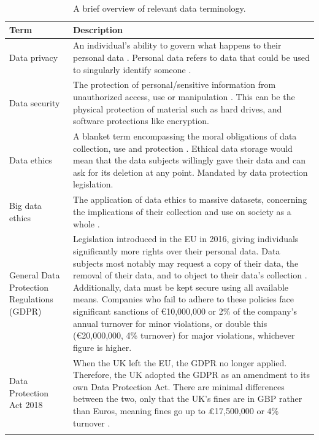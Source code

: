 \documentclass[12pt]{report}
\begin{document}
\begin{longtable}{ | p{} | p{} |}
    \hline
    \cellcolor{blue!25}Term & \cellcolor{blue!25}Description\\
    \hline
    Data privacy & An individual's ability to govern what happens to their personal data \autocite{cloudflare_what_nodate}. Personal data 
    refers to data that could be used to singularly identify someone \autocite{yang_big_2021}.\\
    \hline
    Data security & The protection of personal/sensitive information from unauthorized access, use or manipulation \autocite{ibm_security_2021}.
    This can be the physical protection of material such as hard drives, and software protections like encryption. \\
    \hline
    Data ethics & A blanket term encompassing the moral obligations of data collection, use and protection \autocite{harvard_business_school_5_2021}.
    Ethical data storage would mean that the data subjects willingly gave their data and can ask for its deletion at any point. 
    Mandated by data protection legislation. \\
    \hline 
    Big data ethics & The application of data ethics to massive datasets, concerning the implications of their collection and use on society as a whole
    \autocite{richards_big_2014}. \\ %
    \hline 
    General Data \newline Protection \newline Regulations (GDPR) & Legislation introduced in the EU in 2016, giving individuals significantly more 
    rights over their personal data. Data subjects most notably may request a copy of their data, the removal of their data, and to object to their data's 
    collection \autocite{ico_guide_2024}. Additionally, data must be kept secure using all available means. Companies who fail to adhere to these policies
    face significant sanctions of \euro10,000,000 or 2\% of the company's annual turnover for minor violations, or double this (\euro20,000,000, 4\% turnover)
    for major violations, whichever figure is higher. \\
    \hline
    Data Protection Act 2018 & When the UK left the EU, the GDPR no longer applied. Therefore, the UK adopted the GDPR as an amendment to its own
    Data Protection Act. There are minimal differences between the two, only that the UK's fines are in GBP rather than Euros, meaning fines go up 
    to \pounds17,500,000 or 4\% turnover \autocite{ico_enforcement_2024}. \\
    \hline
\caption{A brief overview of relevant data terminology.}\label{tab:dataTerms}
\end{longtable}
\end{document}
